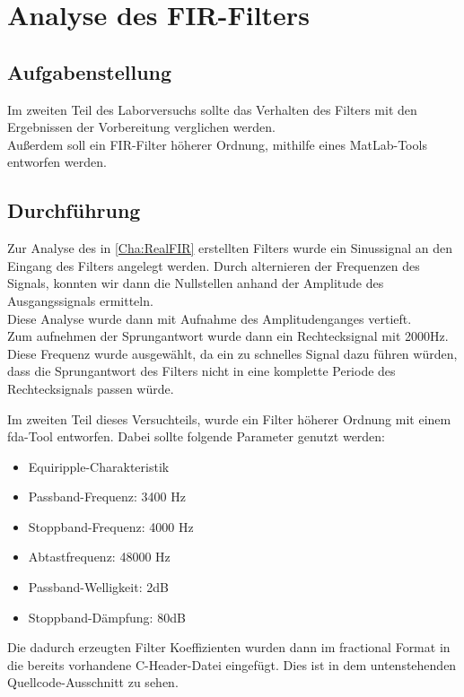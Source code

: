 \chapter{Analyse des FIR-Filters}
\section{Aufgabenstellung}
Im zweiten Teil des Laborversuchs sollte das Verhalten des Filters mit den 
Ergebnissen der Vorbereitung verglichen werden.\\ Außerdem soll ein FIR-Filter 
h\"oherer Ordnung, mithilfe eines MatLab-Tools entworfen werden.
\section{Durchf\"uhrung}
Zur Analyse des in \ref{Cha:RealFIR} erstellten Filters wurde ein Sinussignal 
an den Eingang des Filters angelegt werden. Durch alternieren der Frequenzen des 
Signals, konnten wir dann die Nullstellen anhand der Amplitude des 
Ausgangssignals ermitteln.\\
Diese Analyse wurde dann mit Aufnahme des Amplitudenganges vertieft.\\
Zum aufnehmen der Sprungantwort wurde dann ein Rechtecksignal mit 2000Hz.
Diese Frequenz wurde ausgewählt, da ein zu schnelles Signal dazu führen würden, dass 
die Sprungantwort des Filters nicht in eine komplette Periode des Rechtecksignals passen 
w\"urde.\\\par
Im zweiten Teil dieses Versuchteils, wurde ein Filter h\"oherer Ordnung mit 
einem \gls{fda}-Tool entworfen. Dabei sollte folgende Parameter genutzt werden:
\begin{itemize} 
\item Equiripple-Charakteristik
\item Passband-Frequenz: 3400 Hz
\item Stoppband-Frequenz: 4000 Hz 
\item Abtastfrequenz: 48000 Hz 
\item Passband-Welligkeit: 2dB 
\item Stoppband-D\"ampfung: 80dB
\end{itemize}
\newpage
Die dadurch erzeugten Filter Koeffizienten wurden dann im fractional Format in 
die bereits vorhandene C-Header-Datei eingefügt. Dies ist in dem untenstehenden Quellcode-Ausschnitt zu sehen.\\
